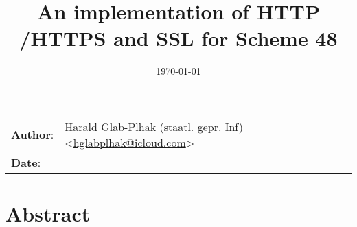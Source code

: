 \documentclass[10pt,a4paper,english]{article}
\title{An implementation of HTTP /HTTPS and SSL for Scheme 48 }
\author{}
\date{}
\newlength{\docinfowidth}
\begin{document}
\maketitle

\begin{center}
\begin{tabularx}{\docinfowidth}{lX}
\textbf{Author}: &
Harald Glab-Plhak  (staatl. gepr. Inf){\textless}\href{mailto:hglabplhak@icloud.com}{hglabplhak@icloud.com}{\textgreater}\\ 
\textbf{Date}: &
\date{\today{}}\\
\end{tabularx}
\end{center}

\maketitle
\tableofcontents

\section{Abstract}
\end{document}
